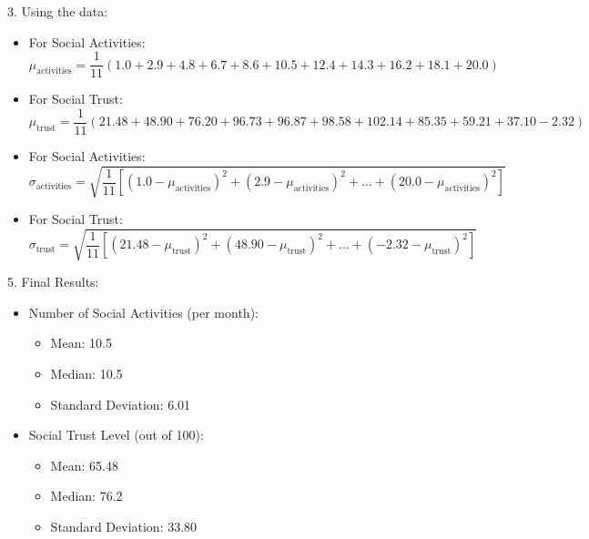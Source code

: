 \documentclass{article}
\begin{document}
3. Using the data:
\begin{itemize}
    \item For Social Activities:
    \[
    \mu_{\text{activities}} = \frac{1}{11} (1.0 + 2.9 + 4.8 + 6.7 + 8.6 + 10.5 + 12.4 + 14.3 + 16.2 + 18.1 + 20.0)
    \]
    
    \item For Social Trust:
    \[
    \mu_{\text{trust}} = \frac{1}{11} (21.48 + 48.90 + 76.20 + 96.73 + 96.87 + 98.58 + 102.14 + 85.35 + 59.21 + 37.10 - 2.32)
    \]
    
    \item For Social Activities:
    \[
    \sigma_{\text{activities}} = \sqrt{\frac{1}{11} \left[(1.0 - \mu_{\text{activities}})^2 + (2.9 - \mu_{\text{activities}})^2 + \ldots + (20.0 - \mu_{\text{activities}})^2\right]}
    \]
    
    \item For Social Trust:
    \[
    \sigma_{\text{trust}} = \sqrt{\frac{1}{11} \left[(21.48 - \mu_{\text{trust}})^2 + (48.90 - \mu_{\text{trust}})^2 + \ldots + (-2.32 - \mu_{\text{trust}})^2\right]}
    \]
\end{itemize}

5. Final Results:
\begin{itemize}
    \item Number of Social Activities (per month):
    \begin{itemize}
        \item Mean: 10.5
        \item Median: 10.5
        \item Standard Deviation: 6.01
    \end{itemize}
    \item Social Trust Level (out of 100):
    \begin{itemize}
        \item Mean: 65.48
        \item Median: 76.2
        \item Standard Deviation: 33.80
    \end{itemize}
\end{itemize}
\end{document}
